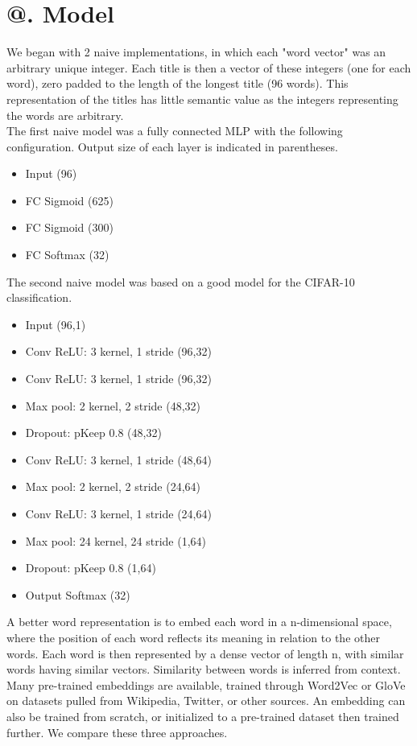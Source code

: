 \documentclass[jou,apacite, 10px]{apa6}
\makeatletter
\newcommand*{\rom}[1]{\expandafter\@slowromancap\romannumeral #1@}
\makeatother
\begin{document}
\section{\rom{4}. Model}
We began with 2 naive implementations, in which each "word vector" was an arbitrary unique integer. Each title is then a vector of these integers (one for each word), zero padded to the length of the longest title (96 words). This representation of the titles has little semantic value as the integers representing the words are arbitrary.\\

The first naive model was a fully connected MLP with the following configuration. Output size of each layer is indicated in parentheses.

\begin{itemize}
    \item Input (96)
    \item FC Sigmoid (625)
    \item FC Sigmoid (300)
    \item FC Softmax (32)
\end{itemize}

The second naive model was based on a good model for the CIFAR-10 classification.

\begin{itemize}
    \item Input (96,1)
    \item Conv ReLU: 3 kernel, 1 stride (96,32)
    \item Conv ReLU: 3 kernel, 1 stride (96,32)
    \item Max pool: 2 kernel, 2 stride (48,32)
    \item Dropout: pKeep 0.8 (48,32)
    \item Conv ReLU: 3 kernel, 1 stride (48,64)
    \item Max pool: 2 kernel, 2 stride (24,64)
    \item Conv ReLU: 3 kernel, 1 stride (24,64)
    \item Max pool: 24 kernel, 24 stride (1,64)
    \item Dropout: pKeep 0.8 (1,64)
    \item Output Softmax (32)
\end{itemize}

A better word representation is to embed each word in a n-dimensional space, where the position of each word reflects its meaning in relation to the other words. Each word is then represented by a dense vector of length n, with similar words having similar vectors. Similarity between words is inferred from context. Many pre-trained embeddings are available, trained through Word2Vec or GloVe on datasets pulled from Wikipedia, Twitter, or other sources. An embedding can also be trained from scratch, or initialized to a pre-trained dataset then trained further. We compare these three approaches.\\
\end{document}
